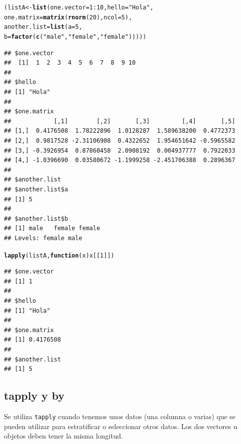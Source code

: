 \documentclass{config/apuntes}\usepackage[]{graphicx}\usepackage[]{xcolor}
\makeatletter
\newcommand{\hlnum}[1]{\textcolor[rgb]{0.686,0.059,0.569}{#1}}%
\newcommand{\hlsng}[1]{\textcolor[rgb]{0.192,0.494,0.8}{#1}}%
\newcommand{\hlopt}[1]{\textcolor[rgb]{0,0,0}{#1}}%
\newcommand{\hldef}[1]{\textcolor[rgb]{0.345,0.345,0.345}{#1}}%
\newcommand{\hlkwa}[1]{\textcolor[rgb]{0.161,0.373,0.58}{\textbf{#1}}}%
\newcommand{\hlkwb}[1]{\textcolor[rgb]{0.69,0.353,0.396}{#1}}%
\newcommand{\hlkwc}[1]{\textcolor[rgb]{0.333,0.667,0.333}{#1}}%
\newcommand{\hlkwd}[1]{\textcolor[rgb]{0.737,0.353,0.396}{\textbf{#1}}}%
\newenvironment{kframe}{%
 \def\at@end@of@kframe{}%
 \ifinner\ifhmode%
  \def\at@end@of@kframe{\end{minipage}}%
  \begin{minipage}{\columnwidth}%
 \fi\fi%
 \def\FrameCommand##1{\hskip\@totalleftmargin \hskip-\fboxsep
 \colorbox{shadecolor}{##1}\hskip-\fboxsep
     \hskip-\linewidth \hskip-\@totalleftmargin \hskip\columnwidth}%
 \MakeFramed {\advance\hsize-\width
   \@totalleftmargin\z@ \linewidth\hsize
   \@setminipage}}%
 {\par\unskip\endMakeFramed%
 \at@end@of@kframe}
\newenvironment{knitrout}{}{} %
\newcommand{\code}[1]{\texttt{#1}}
\makeatother
\begin{document}
\begin{knitrout}
\color{fgcolor}\begin{kframe}
\begin{alltt}
\hldef{(listA} \hlkwb{<-} \hlkwd{list}\hldef{(}\hlkwc{one.vector} \hldef{=} \hlnum{1}\hlopt{:}\hlnum{10}\hldef{,}  \hlkwc{hello} \hldef{=} \hlsng{"Hola"}\hldef{,}
               \hlkwc{one.matrix} \hldef{=} \hlkwd{matrix}\hldef{(}\hlkwd{rnorm}\hldef{(}\hlnum{20}\hldef{),} \hlkwc{ncol} \hldef{=} \hlnum{5}\hldef{),}
               \hlkwc{another.list} \hldef{=} \hlkwd{list}\hldef{(}\hlkwc{a} \hldef{=} \hlnum{5}\hldef{,}
                 \hlkwc{b} \hldef{=} \hlkwd{factor}\hldef{(}\hlkwd{c}\hldef{(}\hlsng{"male"}\hldef{,} \hlsng{"female"}\hldef{,} \hlsng{"female"}\hldef{)))))}
\end{alltt}
\begin{verbatim}
## $one.vector
##  [1]  1  2  3  4  5  6  7  8  9 10
## 
## $hello
## [1] "Hola"
## 
## $one.matrix
##            [,1]        [,2]       [,3]         [,4]       [,5]
## [1,]  0.4176508  1.78222896  1.0128287  1.589638200  0.4772373
## [2,]  0.9817528 -2.31106908  0.4322652  1.954651642 -0.5965582
## [3,] -0.3926954  0.87860458  2.0908192  0.004937777  0.7922033
## [4,] -1.0396690  0.03580672 -1.1999258 -2.451706388  0.2896367
## 
## $another.list
## $another.list$a
## [1] 5
## 
## $another.list$b
## [1] male   female female
## Levels: female male
\end{verbatim}
\begin{alltt}
\hlkwd{lapply}\hldef{(listA,} \hlkwa{function}\hldef{(}\hlkwc{x}\hldef{) x[[}\hlnum{1}\hldef{]])}
\end{alltt}
\begin{verbatim}
## $one.vector
## [1] 1
## 
## $hello
## [1] "Hola"
## 
## $one.matrix
## [1] 0.4176508
## 
## $another.list
## [1] 5
\end{verbatim}
\end{kframe}
\end{knitrout}

\subsection{tapply y by}
Se utiliza \code{tapply} cuando tenemos unos datos (una columna o varias) que se pueden utilizar para estratificar o seleccionar otros datos. Los dos vectores u objetos deben tener la misma longitud. 
\end{document}
